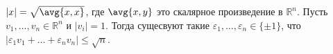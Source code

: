 $|x| = \sqrt{\avg{x, x}}$, где $\avg{x, y}$ это скалярное произведение в $\mathbb{R}^n$. Пусть $v_1,
\dotsc, v_n \in \mathbb{R}^n$ и $|v_i| = 1$. Тогда сущесвуют такие $\varepsilon_1, \dots, \varepsilon_n
\in \{\pm 1\}$, что $|\varepsilon_1v_1 + \dots + \varepsilon_nv_n| \leq \sqrt{n}$. 